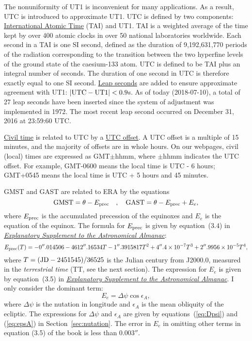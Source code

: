 \documentclass[12pt]{article}
\newcommand \beq {\begin{equation}}
\newcommand \eeq {\end{equation}}
\newcommand{\expl}{\href{http://www.uscibooks.com/urban.htm}{\it Explanatory Supplement to the Astronomical Almanac}}
\begin{document}
The nonuniformity of UT1 is inconvenient for many applications. As a result, 
UTC is introduced to approximate UT1. UTC is defined by two components: 
\href{https://en.wikipedia.org/wiki/International_Atomic_Time}{International 
Atomic Time} (TAI) and UT1. TAI is a weighted average of the time kept by 
over 400 atomic clocks in over 50 national laboratories worldwide. Each second 
in a TAI is one SI second, defined as the duration of 9,192,631,770 periods of 
the radiation corresponding to the transition between the two hyperfine 
levels of the ground state of the caesium-133 atom. UTC is defined to be 
TAI plus an integral number of seconds. The duration of one second in UTC 
is therefore exactly equal to one SI second. \href{https://en.wikipedia.org/wiki/Leap_second}
{Leap seconds} are added to ensure approximate agreement with UT1: $|{\rm UTC-UT1}|<0.9$s. 
As of today (2018-07-10), a total of 27 leap seconds have been inserted since the 
system of adjustment was implemented in 1972. The most recent leap second occurred 
on December 31, 2016 at 23:59:60 UTC.

\href{https://en.wikipedia.org/wiki/Civil_time}{\rm Civil time} is related to 
UTC by a \href{https://en.wikipedia.org/wiki/UTC_offset}{UTC offset}. A UTC 
offset is a multiple of 15 minutes, and the majority of offsets are in whole 
hours. On our webpages, civil (local) times are expressed as GMT$\pm$hhmm, where 
$\pm$hhmm indicates the UTC offset. For example, GMT-0600 means the local time 
is UTC - 6 hours; GMT+0545 means the local time is UTC + 5 hours and 45 minutes.

GMST and GAST are related to ERA by the equations 
\beq
  {\rm GMST} = \theta - E_{\rm prec} \ \ \ , \ \ \ {\rm GAST} = \theta - E_{\rm prec} + E_e ,
\label{eq:GST}
\eeq
where $E_{\rm prec}$ is the accumulated precession of the equinoxes and $E_e$ is 
the equation of the equinox. The formula for $E_{\rm prec}$ is given by 
equation~(3.4) in \expl:
\beq
  E_{\rm prec}(T) = -0''.014506 - 4612''.16534 T - 1''.3915817 T^2 
+ 4''.4\times 10^{-7} T^3 + 2''.9956\times 10^{-5} T^4 ,
\label{eq:Eprec}
\eeq
where $T= ({\rm JD} - 2451545)/36525$ is the Julian century from J2000.0, measured in 
the {\em terrestrial time} (TT, see the next section). The expression for 
$E_e$ is given by equation~(3.5) in \expl. I only consider the dominant term:
\beq
  E_e = \Delta \psi \cos \epsilon_A ,
\label{eq:Ee}
\eeq
where $\Delta \psi$ is the nutation in longitude and $\epsilon_A$ is the mean obliquity 
of the ecliptic. The expressions for $\Delta \psi$ and $\epsilon_A$ are given 
by equations~(\ref{eq:Dpsi}) and (\ref{eq:epsA}) in Section~\ref{sec:nutation}. 
The error in $E_e$ in omitting other terms in equation (3.5) of the book is 
less than $0.003''$.
\end{document}
